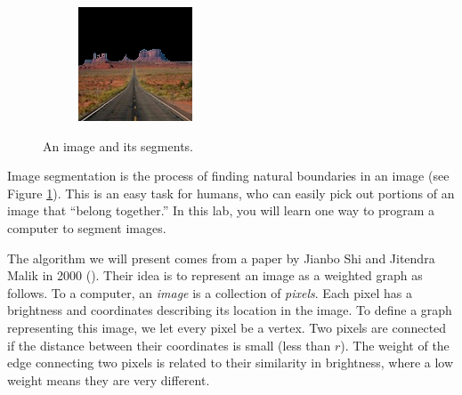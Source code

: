 \begin{figure}
\begin{subfigure}{0.31\textwidth}
    \end{subfigure}
    \hspace*{\fill}
    \begin{subfigure}{0.31\textwidth}
        \includegraphics[width=\textwidth]{PosMon.png}
    \end{subfigure}
    
\caption{An image and its segments.}
\label{fig:monument}
\end{figure}
Image segmentation is the process of finding natural boundaries in an image (see Figure \ref{fig:monument}).
This is an easy task for humans, who can easily pick out portions of an image that ``belong together.''
In this lab, you will learn one way to program a computer to segment images.

The algorithm we will present comes from a paper by Jianbo Shi and Jitendra Malik in 2000 (\cite{Shi2000}).
Their idea is to represent an image as a weighted graph as follows. 
To a computer, an \emph{image} is a collection of \emph{pixels}. 
Each pixel has a brightness and coordinates describing its location in the image.
To define a graph representing this image, we let every pixel be a vertex.
Two pixels are connected if the distance between their coordinates is small (less than $r$).
The weight of the edge connecting two pixels is related to their similarity in brightness, where a low weight means they are very different.

